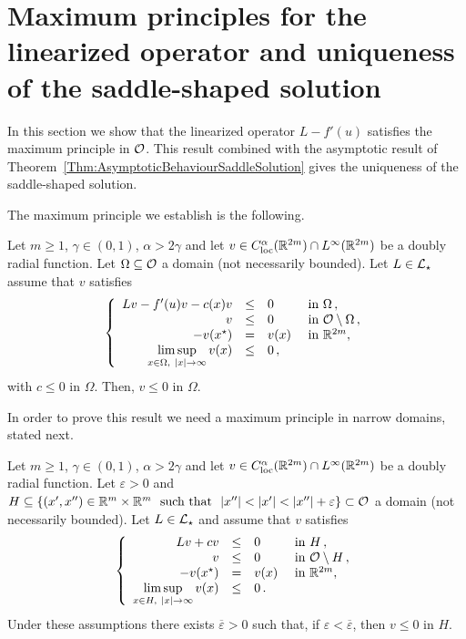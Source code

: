 \section{Maximum principles for the linearized operator and uniqueness of the saddle-shaped solution}
\label{Sec:MaximumPrinciple}

In this section we show that the linearized operator $L -f'(u)$ satisfies the maximum principle in $\mathcal{O}$. This result combined with the asymptotic result of Theorem~\ref{Thm:AsymptoticBehaviourSaddleSolution} gives the uniqueness of the saddle-shaped solution.

The maximum principle we establish is the following.

\begin{proposition}
	\label{Prop:MaximumPrincipleInO}
	Let $m\geq 1$, $\gamma \in (0,1)$, $\alpha > 2\gamma$ and let $v\in C^\alpha_{\mathrm{loc}}(\mathbb{R}^{2m})\cap L^\infty(\mathbb{R}^{2m})$ be a doubly radial function. Let $\Omega \subseteq \mathcal{O}$ a domain (not necessarily bounded). Let $L \in \mathcal{L}_\star$ assume that $v$ satisfies
	$$
	\left\{\begin{array}{rcll}
	Lv - f'(u)v - c(x)v &\leq & 0 &\textrm{ in } \Omega\,,\\
	v &\leq & 0 &\textrm{ in } \mathcal{O} \setminus \Omega\,,\\
	- v(x^\star) & = & v(x) &\textrm{ in } \mathbb{R}^{2m},\\
	\displaystyle \limsup_{x\in \Omega, \ |x|\to \infty} v(x) &\leq & 0\,,
	\end{array} \right.
	$$
	with $c\leq 0$ in $\Omega$.
	Then, $v \leq 0$ in $\Omega$.
\end{proposition}

In order to prove this result we need a maximum principle in narrow domains, stated next.

\begin{proposition}
	\label{Prop:MaximumPrincipleNarrowDomainsOdd}
	Let $m\geq 1$, $\gamma \in (0,1)$, $\alpha > 2\gamma$ and let $v\in C^\alpha_{\mathrm{loc}}(\mathbb{R}^{2m})\cap L^\infty(\mathbb{R}^{2m})$ be a doubly radial function. Let $\varepsilon>0$ and $H \subseteq \{(x',x'')\in \R^m\times\R^m \ \text{ such that }\ |x''|<|x'|<|x''|+ \varepsilon\} \subset \ocal$ a domain (not necessarily bounded). Let $L \in \mathcal{L}_\star$ and assume that $v$ satisfies
	\begin{equation}
	\label{Eq:AssumptionsMaxPNarrow}
	\left\{\begin{array}{rcll}
	Lv + cv&\leq & 0 &\textrm{ in } H\,,\\
	v &\leq & 0 &\textrm{ in } \mathcal{O} \setminus H\,,\\
	- v(x^\star) & = & v(x) &\textrm{ in } \mathbb{R}^{2m},\\
	\displaystyle \limsup_{x\in H, \ |x|\to \infty} v(x) &\leq & 0\,.
	\end{array} \right.
	\end{equation}
	Under these assumptions there exists $\overline{\varepsilon}>0$ such that, if $\varepsilon<\overline{\varepsilon}$, then $v \leq 0$ in $H$.
\end{proposition}

